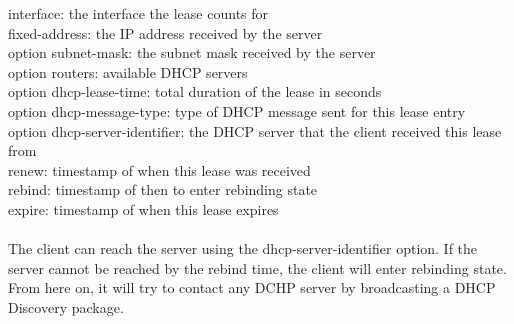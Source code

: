 interface: the interface the lease counts for \\
fixed-address: the IP address received by the server \\
option subnet-mask: the subnet mask received by the server \\
option routers: available DHCP servers \\
option dhcp-lease-time: total duration of the lease in seconds \\
option dhcp-message-type: type of DHCP message sent for this lease entry \\
option dhcp-server-identifier: the DHCP server that the client received this lease from \\
renew: timestamp of when this lease was received \\
rebind: timestamp of then to enter rebinding state \\
expire: timestamp of when this lease expires \\
\\
The client can reach the server using the dhcp-server-identifier option. If the server cannot be reached by the rebind time, the client will enter rebinding state. From here on, it will try to contact any DCHP server by broadcasting a DHCP Discovery package.
